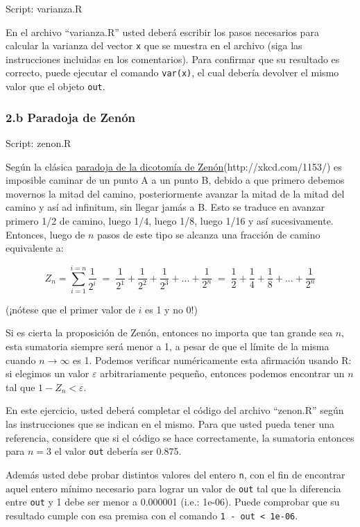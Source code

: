\documentclass[]{article}
\begin{document}
Script: varianza.R

En el archivo ``varianza.R'' usted deberá escribir los pasos necesarios
para calcular la varianza del vector \texttt{x} que se muestra en el
archivo (siga las instrucciones incluidas en los comentarios). Para
confirmar que su resultado es correcto, puede ejecutar el comando
\texttt{var(x)}, el cual debería devolver el mismo valor que el objeto
\texttt{out}.

\subsubsection{2.b Paradoja de Zenón}

Script: zenon.R

Según la clásica
\href{https://es.wikipedia.org/wiki/Paradojas\_de\_Zen\%C3\%B3n\#La\_dicotom.C3.ADa}{paradoja
de la dicotomía de Zenón}(http://xkcd.com/1153/) es imposible caminar de
un punto A a un punto B, debido a que primero debemos movernos la mitad
del camino, posteriormente avanzar la mitad de la mitad del camino y así
ad infinitum, sin llegar jamás a B. Esto se traduce en avanzar primero
1/2 de camino, luego 1/4, luego 1/8, luego 1/16 y así sucesivamente.
Entonces, luego de $n$ pasos de este tipo se alcanza una fracción de
camino equivalente a:

\[
  Z_n = \sum_{i=1}^{i=n} \frac{1}{2 ^ i} \;=\;
  \frac{1}{2 ^ 1} + \frac{1}{2 ^ 2} + \frac{1}{2 ^ 3} + ... + \frac{1}{2 ^ n} \;=\;
  \frac{1}{2} + \frac{1}{4} + \frac{1}{8} + ... + \frac{1}{2 ^ n}
\]

(¡nótese que el primer valor de $i$ es 1 y no 0!)

Si es cierta la proposición de Zenón, entonces no importa que tan grande
sea $n$, esta sumatoria siempre será menor a 1, a pesar de que el límite
de la misma cuando $n \to \infty$ es 1. Podemos verificar numéricamente
esta afirmación usando R: si elegimos un valor $\varepsilon$
arbitrariamente pequeño, entonces podemos encontrar un $n$ tal que
$1 - Z_n < \varepsilon$.

En este ejercicio, usted deberá completar el código del archivo
``zenon.R'' según las instrucciones que se indican en el mismo. Para que
usted pueda tener una referencia, considere que si el código se hace
correctamente, la sumatoria entonces para $n = 3$ el valor \texttt{out}
debería ser 0.875.

Además usted debe probar distintos valores del entero \texttt{n}, con el
fin de encontrar aquel entero mínimo necesario para lograr un valor de
\texttt{out} tal que la diferencia entre \texttt{out} y 1 debe ser menor
a 0.000001 (i.e.: 1e-06). Puede comprobar que su resultado cumple con
esa premisa con el comando \texttt{1 - out \textless{} 1e-06}.
\end{document}
